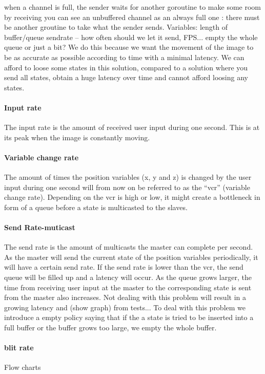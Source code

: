 \documentclass[12pt, a4paper, oneside]{article}
\begin{document}
when a channel is full, the sender waits for another goroutine to make some room by receiving
you can see an unbuffered channel as an always full one : there must be another groutine to take what the sender sends.
\newline
\newline
Variables:
length of buffer/queue
sendrate – how often should we let it send, FPS...
empty the whole queue or just a bit?
\newline
\newline
We do this because we want the movement of the image to be as accurate as possible according to time with a minimal latency. 
We can afford to loose some states in this solution, compared to a solution where you send all states, obtain a huge latency over time and cannot afford loosing any states.

\paragraph{Input rate}
The input rate is the amount of received user input during one second. This is at its peak when the image is constantly moving.
\paragraph{Variable change rate}
The amount of times the position variables (x, y and z) is changed by the user input during one second will from now on be referred to as the “vcr” (variable change rate).
Depending on the vcr is high or low, it might create a bottleneck in form of a queue before a state is multicasted to the slaves. 
\paragraph{Send Rate-muticast}
The send rate is the amount of multicasts the master can complete per second. As the master will send the current state of the position variables periodically, it will have a certain send rate. If the send rate is lower than the vcr, the send queue will be filled up and a latency will occur. As the queue grows larger, the time from receiving user input at the master to the corresponding state is sent from the master also increases. 
Not dealing with this problem will result in a growing latency and (show graph) from tests... 
To deal with this problem we introduce a empty policy saying that if the a state is tried to be inserted into a full buffer or the buffer grows too large, we empty the whole buffer.
\paragraph{blit rate}
Flow charts
\end{document}
